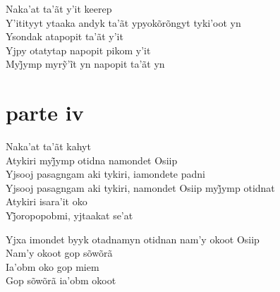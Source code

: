 \noindent   Naka'at ta'ãt y'it keerep\\
  Y'itityyt ytaaka andyk ta'ãt ypyokõrõngyt tyki'oot yn\\
  Ysondak atapopit ta'ãt y'it\\
  Yjpy otatytap napopit pikom y'it\\
  Myj̃ymp myrỹ’ĩt yn napopit ta’ãt yn
 
 
\medskip
\section{parte iv}

  \noindent Naka'at ta'ãt kahyt\\
  Atykiri myj̃ymp otidna namondet Osiip\\
  Yjsooj pasagngam aki tykiri, iamondete padni\\
  Yjsooj pasagngam aki tykiri, namondet Osiip myj̃ymp otidnat\\
  Atykiri isara'it oko\\
  Yj̃oropopobmi, yjtaakat se’at
 
 \smallskip
 \begin{center}\end{center}
 \smallskip
 
\noindent   Yjxa imondet byyk otadnamyn otidnan nam'y okoot Osiip\\
  Nam'y okoot gop sõwõrã\\
  Ia'obm oko gop miem\\
  Gop sõwõrã ia'obm okoot
 
